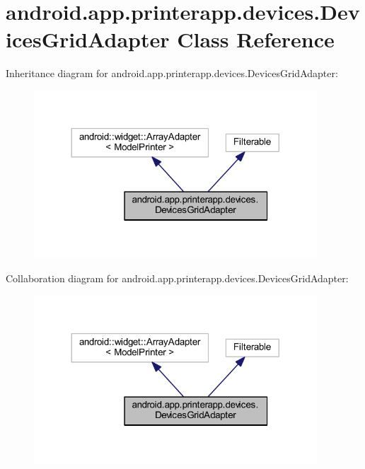 \hypertarget{classandroid_1_1app_1_1printerapp_1_1devices_1_1_devices_grid_adapter}{}\section{android.\+app.\+printerapp.\+devices.\+Devices\+Grid\+Adapter Class Reference}
\label{classandroid_1_1app_1_1printerapp_1_1devices_1_1_devices_grid_adapter}


Inheritance diagram for android.\+app.\+printerapp.\+devices.\+Devices\+Grid\+Adapter\+:
\nopagebreak
\begin{figure}[H]
\begin{center}
\leavevmode
\includegraphics[width=300pt]{classandroid_1_1app_1_1printerapp_1_1devices_1_1_devices_grid_adapter__inherit__graph}
\end{center}
\end{figure}


Collaboration diagram for android.\+app.\+printerapp.\+devices.\+Devices\+Grid\+Adapter\+:
\nopagebreak
\begin{figure}[H]
\begin{center}
\leavevmode
\includegraphics[width=300pt]{classandroid_1_1app_1_1printerapp_1_1devices_1_1_devices_grid_adapter__coll__graph}
\end{center}
\end{figure}
